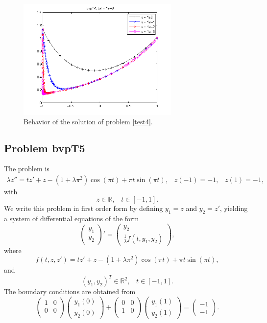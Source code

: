 \documentclass[<options>]{article}
\def \RR {{\mathbb{R}}}
\begin{document}
\begin{figure}[htb]
\centerline{\includegraphics[height=6cm]{Prob4}}
\caption{Behavior of the solution of problem \ref{test4}.}
\end{figure}
\newpage
\subsection{Problem bvpT5}\label{test5}
The problem is 
\begin{eqnarray*}
\lambda z'' =  t z' + z -( 1 +\lambda \pi^{2}) \cos(\pi t) + \pi t \sin(\pi t), \;\;\;z(-1) =   -1, \;\;\; z(1) = -1,
\end{eqnarray*}
with
\[
z \in \RR, \;\;\; t\in [-1,1].
\]
We write this problem in first order form by defining $y_1=z$ and $y_2=z'$, yielding a system of differential equations of the form
\begin{equation*}
\left(\begin{array}{c}
y_1\\
y_2
\end{array}\right)'=
\left(\begin{array}{c}
y_2\\
\frac{1}{\lambda}f(t,y_1,y_2)
\end{array}\right),
\end{equation*}
where
\begin{equation*}
f(t,z,z') = t z' + z -( 1 +\lambda \pi^{2}) \cos(\pi t) + \pi t \sin(\pi t),
\end{equation*}
and
\[
(y_1,y_2)^T \in \RR^{2}, \;\;\;  t \in [-1,1].
\]
The  boundary conditions are obtained from
\begin{equation*}
\left(
  \begin{array}{cc}
    1 & 0 \\
    0 & 0 \\
  \end{array}
\right)
\left(\begin{array}{c}
y_{1}(0)\\
y_{2}(0)
\end{array}\right)
+
\left(
  \begin{array}{cc}
    0 & 0 \\
    1 & 0 \\
  \end{array}
\right)
\left(\begin{array}{c}
y_{1}(1)\\
y_{2}(1)
\end{array}\right)=\left(\begin{array}{c}
-1 \\
-1
\end{array}\right).
\end{equation*}
\end{document}
